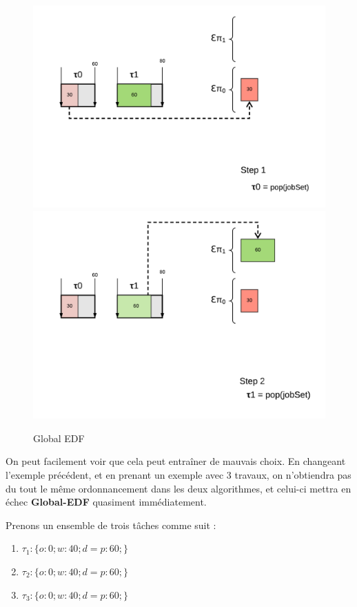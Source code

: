 	\begin{figure}[H]
		\includegraphics[scale=0.5]{img/gedf/gedf}
		\includegraphics[scale=0.5]{img/gedf/gedf2}
		\caption{Global EDF}
	\end{figure}
	 
	On peut facilement voir que cela peut entraîner de \og{}mauvais choix\fg{}. 
	En changeant l'exemple précédent, et en prenant un exemple avec 3 travaux, 
	on n'obtiendra pas du tout le même ordonnancement dans les deux algorithmes, 
	et celui-ci mettra en échec \textbf{Global-EDF} quasiment immédiatement.\newline
	
	Prenons un ensemble de trois tâches comme suit :

	\begin{enumerate}
		\setlength\itemsep{0.1em}
		\item $\tau_1 : \{o:0; w:40; d=p:60;\}$
		\item $\tau_2 : \{o:0; w:40; d=p:60;\}$
		\item $\tau_3 : \{o:0; w:40; d=p:60;\}$
	\end{enumerate}
	
